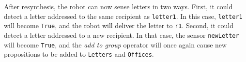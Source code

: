 After resynthesis, the robot can now sense letters in two ways. First, it could detect a letter addressed to the same recipient as \texttt{letter1}. In this case, \texttt{letter1} will become \texttt{True}, and the robot will deliver the letter to \texttt{r1}. Second, it could detect a letter addressed to a new recipient. In that case, the sensor \texttt{newLetter} will become \texttt{True}, and the \emph{add to group} operator will once again cause new propositions to be added to \texttt{Letters} and \texttt{Offices}.

%
%
%	
%	
%	
%	
%

